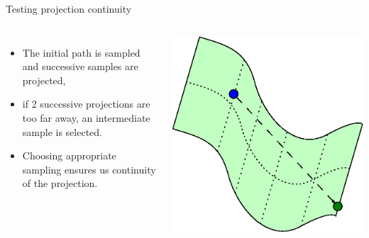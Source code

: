 %
%

\begin {frame} {Testing projection continuity}
  \begin{columns}
    \centering
    \begin {itemize}
      \item The initial path is sampled and successive samples are projected,
      \item {\color {white} if 2 successive projections are too far away, an intermediate sample is selected.}
      \item {\color {white} Choosing appropriate sampling ensures us continuity of the projection.}
    \end {itemize}
    \begin {center}
      \includegraphics [width=.9\linewidth] {figures/progressive_0.eps}
    \end {center}
  \end {columns}
\end {frame}

%
%

